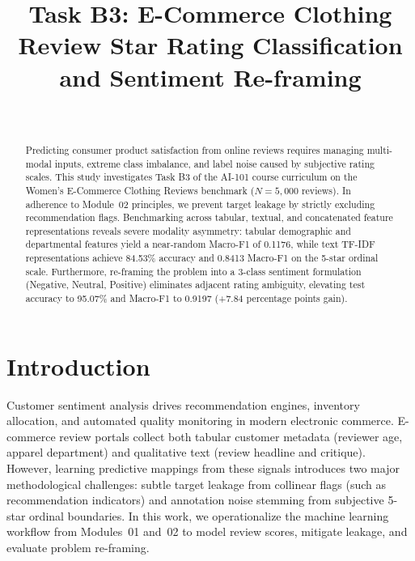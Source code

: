 \documentclass[10pt,journal,compsoc,twocolumn]{IEEEtran}
\begin{document}
\title{Task B3: E-Commerce Clothing Review Star Rating Classification and Sentiment Re-framing}

\author{
    \\
}

\maketitle

\begin{abstract}
Predicting consumer product satisfaction from online reviews requires managing multi-modal inputs, extreme class imbalance, and label noise caused by subjective rating scales. This study investigates Task B3 of the AI-101 course curriculum on the Women's E-Commerce Clothing Reviews benchmark ($N = 5,000$ reviews). In adherence to Module~02 principles, we prevent target leakage by strictly excluding recommendation flags. Benchmarking across tabular, textual, and concatenated feature representations reveals severe modality asymmetry: tabular demographic and departmental features yield a near-random Macro-F1 of 0.1176, while text TF-IDF representations achieve 84.53\% accuracy and 0.8413 Macro-F1 on the 5-star ordinal scale. Furthermore, re-framing the problem into a 3-class sentiment formulation (Negative, Neutral, Positive) eliminates adjacent rating ambiguity, elevating test accuracy to 95.07\% and Macro-F1 to 0.9197 (+7.84 percentage points gain).
\end{abstract}

\section{Introduction}
Customer sentiment analysis drives recommendation engines, inventory allocation, and automated quality monitoring in modern electronic commerce. E-commerce review portals collect both tabular customer metadata (reviewer age, apparel department) and qualitative text (review headline and critique). However, learning predictive mappings from these signals introduces two major methodological challenges: subtle target leakage from collinear flags (such as recommendation indicators) and annotation noise stemming from subjective 5-star ordinal boundaries. In this work, we operationalize the machine learning workflow from Modules~01 and~02 to model review scores, mitigate leakage, and evaluate problem re-framing.
\end{document}
